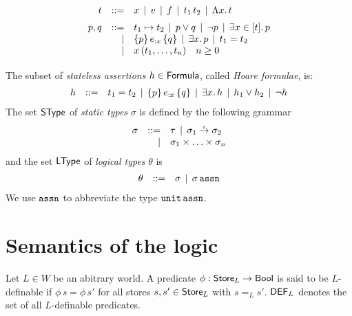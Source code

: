 \documentclass[12pt,a4paper]{report}
\newcommand{\ssto}{\nstyle{sto}}
\newcommand{\DEF}{\sstyle{DEF}}
\begin{document}
\[\GRbeg
  t \GRis x \GRmid v \GRmid f \GRmid \app{t_1}{t_2} \GRmid \tabstr{x}{t}
    \GRnl

  p,q \GRis t_1 \mapsto t_2 \GRmid p \vee q \GRmid \neg p \GRmid \qbex{x}{t}{p}
      \GRal \triple{p}{e_{:x}}{q} \GRmid \qex{x}{p} \GRmid t_1 = t_2
      \GRal x\,(t_1,\ldots,t_n) \quad n \ge 0
      \GRnl
\GRend\]
The subset of {\em stateless assertions} $h \in \mathsf{Formula}$, called {\em Hoare formulae}, is:
\[\begin{array}{rrlll}
  h & ::= & t_1 = t_2 \,\mid\, \{p\}\,e_{:x}\,\{q\} \,\mid\, \exists{x}.\,{h} \,\mid\, h_1 \vee h_2 \,\mid\, \neg h
\end{array}\]
The set $\mathsf{SType}$ of {\em static types} $\sigma$ is defined by the following grammar
\[\begin{array}{rrlll}
  \sigma & ::= & \tau \,\mid\, \sigma_1\stackrel{_t}{\to}\sigma_2
  \\ & \mid & \sigma_1 \times \ldots \times \sigma_n
\end{array}\]
and the set $\mathsf{LType}$ of {\em logical types} $\theta$ is
\[\begin{array}{rrlll}
  \theta & ::= & \sigma \,\mid\, \sigma\,\mathtt{assn}
\end{array}\]
We use $\mathtt{assn}$ to abbreviate the type $\mathtt{unit}\,\mathtt{assn}$.



\section{Semantics of the logic}

\begin{definition}[$L$-definability]
  Let $L\in W$ be an abitrary world. A predicate $\phi : \mathsf{Store}_L \to \mathsf{Bool}$ is said to be $L$-definable
  if $\phi\,s = \phi\,s'$ for all stores $s,s' \in \mathsf{Store}_L$ with $s =_L s'$. $\DEF_L$ denotes the set of
  all $L$-definable predicates.
\end{definition}


\end{document}
